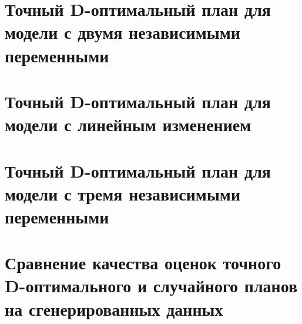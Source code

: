\section{Точный D-оптимальный план для модели с двумя независимыми переменными}
\label{chapter2/diploma-section-2-1}


\section{Точный D-оптимальный план для модели с линейным изменением}
\label{chapter2/diploma-section-2-2}


\section{Точный D-оптимальный план для модели с тремя независимыми переменными}
\label{chapter2/diploma-section-2-3}


\section{Сравнение качества оценок точного D-оптимального и случайного планов на сгенерированных данных}
\label{chapter2/diploma-section-2-4}


